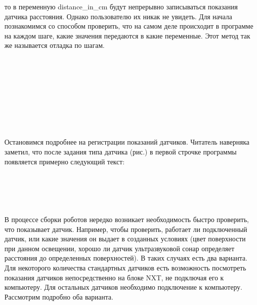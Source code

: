 то в переменную distance\_in\_cm  будут непрерывно записываться показания датчика расстояния. Однако пользователю их никак не увидеть. Для начала познакомимся со способом проверить, что на самом деле происходит в программе на каждом шаге, какие значения передаются в какие переменные. Этот метод так же называется отладка по шагам.\\\\

\\\\

{\hypertarget{lesson14x3}{}}\\\\ 	

\\\\

{\hypertarget{lesson14x4}{}}\\\\

Остановимся подробнее на регистрации показаний датчиков. Читатель наверняка заметил, что после задания типа датчика (рис.) в первой строчке программы появляется примерно следующий текст:\\\\

\\\\

\\\\

В процессе сборки роботов нередко возникает необходимость быстро проверить, что показывает датчик. Например, чтобы проверить, работает ли подключенный датчик, или какие значения он выдает в созданных условиях (цвет поверхности при данном освещении, хорошо ли датчик ультразвуковой сонар определяет расстояния до определенных поверхностей). В таких случаях есть два варианта. Для некоторого количества стандартных датчиков есть возможность посмотреть показания датчиков непосредственно на блоке NXT, не подключая его к компьютеру. Для остальных датчиков необходимо подключение к компьютеру. Рассмотрим подробно оба варианта.

